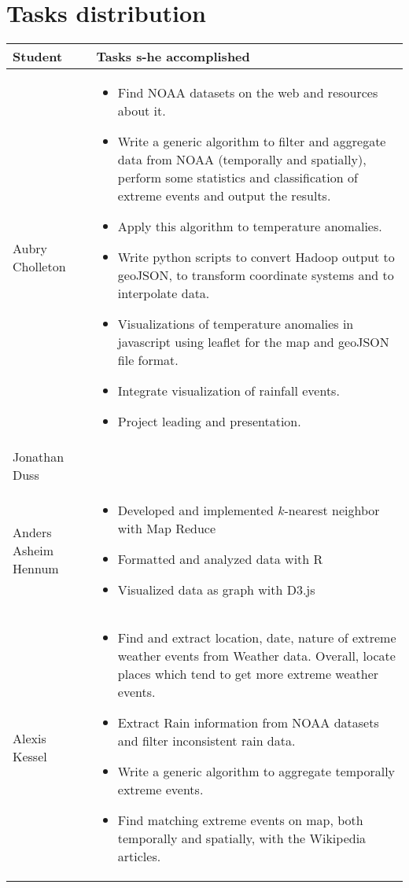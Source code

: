 \section{Tasks distribution}
\begin{longtable}{|l|p{10.5cm}|}
\hline
\textbf{Student} & \textbf{Tasks s-he accomplished} \\
\hline
Aubry Cholleton & \begin{itemize}
	\item Find NOAA datasets on the web and resources about it.
	\item Write a generic algorithm to filter and aggregate data from NOAA (temporally and spatially), perform some statistics and classification of extreme events and output the results.
	\item Apply this algorithm to temperature anomalies.
	\item Write python scripts to convert Hadoop output to geoJSON, to transform coordinate systems and to interpolate data.
	\item Visualizations of temperature anomalies in javascript using leaflet for the map and geoJSON file format.
	\item Integrate visualization of rainfall events.
	\item Project leading and presentation.
\end{itemize}\\
\hline
Jonathan Duss & \\
\hline
Anders Asheim Hennum & \begin{itemize}
	\item Developed and implemented $k$-nearest neighbor with Map Reduce
	\item Formatted and analyzed data with R
	\item Visualized data as graph with D3.js
\end{itemize}\\
\hline
Alexis Kessel & \begin{itemize}
	\item Find and extract location, date, nature of extreme weather events from Weather data. Overall, locate places which tend to get more extreme weather events.
	\item Extract Rain information from NOAA datasets and filter inconsistent rain data.
	\item Write a generic algorithm to aggregate temporally extreme events.
	\item Find matching extreme events on map, both temporally and spatially, with the Wikipedia articles.

\end{itemize}
\end{longtable}
